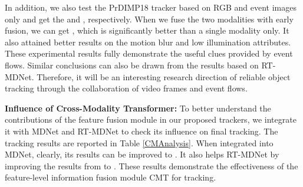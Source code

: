 \documentclass[journal]{IEEEtran}
\begin{document}
In addition, we also test the PrDIMP18 tracker based on RGB and event images only and get the  and , respectively. When we fuse the two modalities with early fusion, we can get , which is significantly better than a single modality only. It also attained better results on the motion blur and low illumination attributes. 
These experimental results fully demonstrate the useful clues provided by event flows. Similar conclusions can also be drawn from the results based on RT-MDNet. Therefore, it will be an interesting research direction of reliable object tracking through the collaboration of video frames and event flows. 


\noindent 
\textbf{Influence of Cross-Modality Transformer:}  
To better understand the contributions of the feature fusion module in our proposed trackers, we integrate it with MDNet and RT-MDNet to check its influence on final tracking. The tracking results are reported in Table \ref{CMAnalysis}. When integrated into MDNet, clearly, its results  can be improved to . It also helps RT-MDNet by improving the results from  to . These results demonstrate the effectiveness of the feature-level information fusion module CMT for tracking. 





\begin{table}
\center
\caption{Up: component analysis of our tracking model; Down: modality analysis of PrDIMP18 on all testing videos, motion blur (MB), and low illumination (LI) subset.}
\label{CMAnalysis} 
\end{table} 
\end{document}
